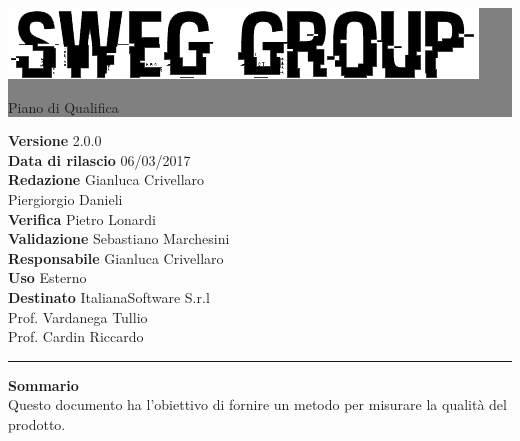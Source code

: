 \documentclass[12pt,a4paper,titlepage]{article}
\newcommand{\HRule}[1]{\hfill \rule{0.2\linewidth}{#1}} %
\begin{document}
	
	\thispagestyle{empty} %
	
	
	\colorbox{grey}{
		\parbox[t]{1.0\linewidth}{
			\centering \fontsize{50pt}{80pt}\selectfont %
			\vspace*{0.7cm} %
			
			\raggedleft
			\includegraphics[width=0.7\linewidth]{../../LogoSWEgGroupSFONDOVUOTO}
			
			\hfill Piano di Qualifica \\
			
			\vspace*{0.7cm} %
		}
	}
	
	
	\vfill %
	
	
	{\centering \large 
		\hfill \textbf{Versione} 2.0.0 \\
		\hfill \textbf{Data di rilascio} 06/03/2017 \\
		\hfill \textbf{Redazione} Gianluca Crivellaro \\
		\hfill Piergiorgio Danieli \\
		\hfill \textbf{Verifica} Pietro Lonardi \\
		\hfill \textbf{Validazione} Sebastiano Marchesini \\
		\hfill \textbf{Responsabile} Gianluca Crivellaro \\
		\hfill \textbf{Uso} Esterno \\
		\hfill \textbf{Destinato} ItalianaSoftware S.r.l \\
		\hfill Prof. Vardanega Tullio \\
		\hfill Prof. Cardin Riccardo \\ 
		
		\HRule{1pt}
		
		\textbf{Sommario} \\
		Questo documento ha l'obiettivo di fornire un metodo per misurare la qualità del prodotto.
		
	} %
	
\end{document}
